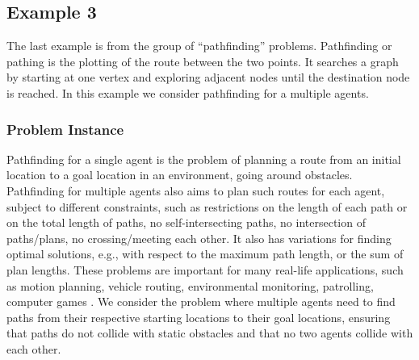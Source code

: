 \documentclass[14pt,a4paper, titlepage]{article}
\begin{document}
\subsection{Example 3}
\label{example3}
The last example is from the group of ``pathfinding'' problems. Pathfinding or pathing is the plotting of 
the route between the two points. It searches a 
graph by starting at one vertex and exploring adjacent 
nodes until the destination node is reached. In this 
example we consider pathfinding for a multiple agents.
 
\subsubsection{Problem Instance}
Pathfinding for a single agent is the problem of planning a 
route from an initial
location to a goal location in an environment, going around 
obstacles. 
Pathfinding for multiple agents also aims to plan such 
routes for each agent, 
subject to different constraints, such as restrictions on 
the length of each path 
or on the total length of paths, no self-intersecting 
paths, no intersection of 
paths/plans, no crossing/meeting each other.  It also has 
variations for finding optimal solutions, e.g., with 
respect 
to the maximum path length, or the sum of plan lengths. 
These problems are important
for many real-life applications, such as motion planning, 
vehicle routing, environmental monitoring, patrolling, 
computer games \cite{multipleAgents}. We consider the 
problem 
where multiple agents need to find paths 
from their respective starting locations to their goal 
locations, ensuring that 
paths do not collide with static obstacles and that no two 
agents collide with 
each other. 
\end{document}
